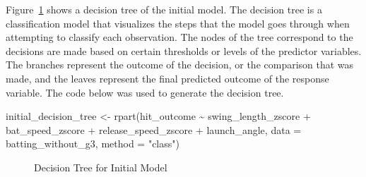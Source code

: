 \documentclass[
  letterpaper,
  DIV=11,
  numbers=noendperiod]{scrartcl}
\newenvironment{Shaded}{\begin{snugshade}}{\end{snugshade}}
\newcommand{\AttributeTok}[1]{\textcolor[rgb]{0.40,0.45,0.13}{#1}}
\newcommand{\FunctionTok}[1]{\textcolor[rgb]{0.28,0.35,0.67}{#1}}
\newcommand{\NormalTok}[1]{\textcolor[rgb]{0.00,0.23,0.31}{#1}}
\newcommand{\OtherTok}[1]{\textcolor[rgb]{0.00,0.23,0.31}{#1}}
\newcommand{\SpecialCharTok}[1]{\textcolor[rgb]{0.37,0.37,0.37}{#1}}
\newcommand{\StringTok}[1]{\textcolor[rgb]{0.13,0.47,0.30}{#1}}
\begin{document}
Figure~\ref{fig-init-dec-tree} shows a decision tree of the initial
model. The decision tree is a classification model that visualizes the
steps that the model goes through when attempting to classify each
observation. The nodes of the tree correspond to the decisions are made
based on certain thresholds or levels of the predictor variables. The
branches represent the outcome of the decision, or the comparison that
was made, and the leaves represent the final predicted outcome of the
response variable. The code below was used to generate the decision
tree.

\begin{Shaded}
\begin{Highlighting}[]
\NormalTok{initial\_decision\_tree }\OtherTok{\textless{}{-}} \FunctionTok{rpart}\NormalTok{(hit\_outcome }\SpecialCharTok{\textasciitilde{}} 
\NormalTok{                                 swing\_length\_zscore }\SpecialCharTok{+}
\NormalTok{                                 bat\_speed\_zscore }\SpecialCharTok{+}
\NormalTok{                                 release\_speed\_zscore }\SpecialCharTok{+}
\NormalTok{                                 launch\_angle,}
                               \AttributeTok{data =}\NormalTok{ batting\_without\_g3,}
                               \AttributeTok{method =} \StringTok{"class"}\NormalTok{)}
\end{Highlighting}
\end{Shaded}

\begin{figure}[H]


\caption{\label{fig-init-dec-tree}Decision Tree for Initial Model}

\end{figure}%
\end{document}
